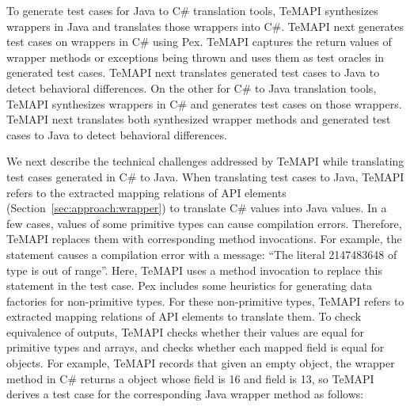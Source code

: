 
To generate test cases for Java to C\# translation tools, TeMAPI synthesizes wrappers in Java and translates those wrappers into C\#. TeMAPI next generates test cases on wrappers in C\# using Pex. TeMAPI captures the return values of wrapper methods or exceptions being thrown and uses them as test oracles in generated test cases. TeMAPI next translates generated test cases to Java to detect behavioral differences. On the other for C\# to Java translation tools, TeMAPI synthesizes wrappers in C\# and generates test cases on those wrappers. TeMAPI next translates both synthesized wrapper methods and generated test cases to Java to detect behavioral differences.


We next describe the technical challenges addressed by TeMAPI while translating test cases generated in C\# to Java. When translating test cases to Java, TeMAPI refers to the extracted mapping relations of API elements (Section~\ref{sec:approach:wrapper}) to translate C\# values into Java values. In a few cases, values of some primitive types can cause compilation errors. Therefore, TeMAPI replaces them with corresponding method invocations. For example, the  statement causes a compilation error with a message: ``The literal 2147483648 of type  is out of range''. Here, TeMAPI uses a method invocation to replace this statement in the  test case. Pex includes some heuristics for generating data factories for non-primitive types. For these non-primitive types, TeMAPI refers to extracted mapping relations of API elements to translate them. To check equivalence of outputs, TeMAPI checks whether their values are equal for primitive types and arrays, and checks whether each mapped field is equal for objects. For example, TeMAPI records that given an empty object, the  wrapper method in C\# returns a  object whose  field is 16 and  field is 13, so TeMAPI derives a test case for the corresponding Java wrapper method as follows:

